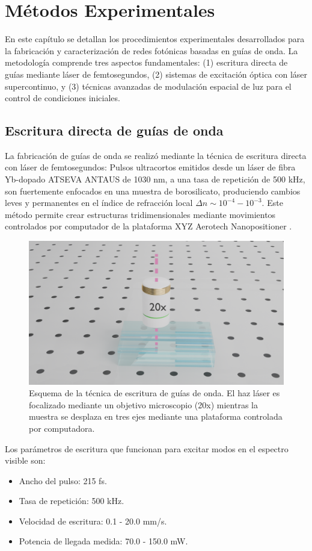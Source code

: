 \chapter{Métodos Experimentales \label{cap:exp}}

En este capítulo se detallan los procedimientos experimentales desarrollados para la fabricación y caracterización de redes fotónicas basadas en guías de onda. La metodología comprende tres aspectos fundamentales: (1) escritura directa de guías mediante láser de femtosegundos, (2) sistemas de excitación óptica con láser supercontinuo, y (3) técnicas avanzadas de modulación espacial de luz para el control de condiciones iniciales.


\section{Escritura directa de guías de onda \label{cap:fs}}

La fabricación de guías de onda se realizó mediante la técnica de escritura directa con láser de femtosegundos: Pulsos ultracortos emitidos desde un láser de fibra Yb-dopado ATSEVA ANTAUS de 1030 nm, a una tasa de repetición de 500 kHz, son fuertemente enfocados en una muestra de borosilicato, produciendo cambios leves y permanentes en el índice de refracción local $\Delta n \sim 10^{-4}-10^{-3}$. Este método permite crear estructuras tridimensionales mediante movimientos controlados por computador de la plataforma XYZ Aerotech Nanopositioner \citep{femto_writing}.

\begin{figure}[H]
    \centering
    \includegraphics[width=0.5\linewidth, trim={18cm 4cm 15cm 6cm},clip]{media/fabrication1}
    \caption[Esquema de la técnica de escritura de guías de onda.]{Esquema de la técnica de escritura de guías de onda. El haz láser es focalizado mediante un objetivo microscopio (20x) mientras la muestra se desplaza en tres ejes mediante una plataforma controlada por computadora.}
\end{figure}

Los parámetros de escritura que funcionan para excitar modos en el espectro visible son:
\begin{itemize}
	\item Ancho del pulso: 215 fs.
    \item Tasa de repetición: 500 kHz.
    \item Velocidad de escritura: 0.1 - 20.0 mm/s.
    \item Potencia de llegada medida: 70.0 - 150.0 mW.
\end{itemize}


